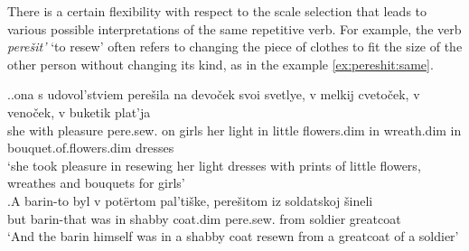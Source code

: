 %
%
%

There is a certain flexibility with respect to the scale selection that leads to various possible interpretations of the same repetitive verb. For example, the verb \textit{pere\v{s}it'} `to resew' often refers to changing the piece of clothes to fit the size of the other person without changing its kind, as in the example \ref{ex:pereshit:same}.

\ex.\label{ex:pereshit}\ag.\label{ex:pereshit:same}ona s udovol'stviem pere\v{s}ila na devo\v{c}ek svoi svetlye, v melkij cveto\v{c}ek, v veno\v{c}ek, v buketik plat'ja\\
she with pleasure pere.sew. on girls her light in little flowers.dim in wreath.dim in bouquet.of.flowers.dim dresses\\
\trans `she took pleasure in resewing her light dresses with prints of little flowers, wreathes and bouquets for girls'\\
\bg.\label{ex:pereshit:other}A barin-to byl v pot\"{e}rtom pal'ti\v{s}ke, pere\v{s}itom iz soldatskoj \v{s}ineli\\
but barin-that was in shabby coat.dim pere.sew. from soldier greatcoat\\
\trans `And the barin himself was in a shabby coat resewn from a greatcoat of a soldier'

